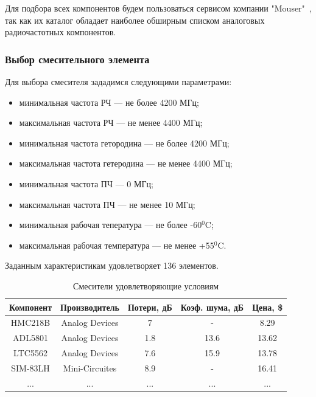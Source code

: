 \documentclass[utf8x, 14pt, oneside, a4paper]{article}
\begin{document}
			Для подбора всех компонентов будем пользоваться сервисом компании "Mouser"\ \cite{bib:mouser}, так как их каталог обладает наиболее обширным списком аналоговых радиочастотных компонентов.
		
			\subsubsection{Выбор смесительного элемента}
				Для выбора смесителя зададимся следующими параметрами:
				
				\begin{itemize}
					\item минимальная частота РЧ --- не более 4200 МГц;
					\item максимальная частота РЧ --- не менее 4400 МГц;
					\item минимальная частота гетородина --- не более 4200 МГц;
					\item максимальная частота гетеродина --- не менее 4400 МГц;
					\item минимальная частота ПЧ --- 0 МГц;
					\item максимальная частота ПЧ --- не менее 10 МГц;
					\item минимальная рабочая тепература --- не более -60$^0$C;
					\item максимальная рабочая температура --- не менее +55$^0$C.
				\end{itemize}
			
			\vspace{\baselineskip}
			
			Заданным характеристикам удовлетворяет 136 элементов.
				
				\begin{table}[H]	
					\centering
					\begin{tabular}{|c|c|c|c|c|}
						\hline
						Компонент & Производитель & Потери, дБ & Коэф. шума, дБ & Цена, \$ \\
						\hline
						HMC218B & Analog Devices & 7 & - & 8.29 \\
						\hline
						ADL5801 & Analog Devices & 1.8 & 13.6 & 13.62 \\
						\hline
						LTC5562 & Analog Devices & 7.6 & 15.9 & 13.78 \\
						\hline
						SIM-83LH & Mini-Circuites & 8.9 & - & 16.41 \\
						\hline
						... & ... & ... & ... & ... \\
						\hline
					\end{tabular}
					\caption{Смесители удовлетворяющие условиям}
					\label{table:Mixers}
				\end{table}
				
\end{document}
